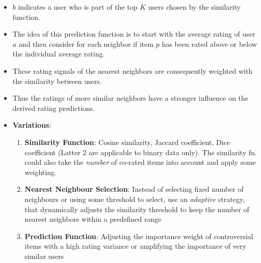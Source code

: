 \documentclass{article}
\begin{document}
\begin{itemize}
    \item $b$ indicates a user who is part of the top $K$ users chosen by the similarity function. 
    
    \item The idea of this prediction function is to start with the average rating of user $a$ and then consider for each neighbor if item $p$ has been rated above or below the individual average rating. 
    
    \item These rating signals of the nearest neighbors are consequently weighted with the similarity between users. 
    
    \item Thus the ratings of more similar neighbors have a stronger influence on the derived rating predictions. 
    
    \item \textbf{Variations}:
    \begin{enumerate}
        \item \textbf{Similarity Function}: Cosine similarity, Jaccard coefficient, Dice coefficient (Latter 2 are applicable to binary data only). The similarity fn. could also take the \textit{number} of co-rated items into account and apply some weighting. 
        
        \item \textbf{Nearest Neighbour Selection}: Instead of selecting fixed number of neighbours or using some threshold to select, use an \textit{adaptive} strategy, that dynamically adjusts the similarity threshold to keep the number of nearest neighbors within a predefined range
        
        \item \textbf{Prediction Function}: Adjusting the importance weight of controversial items with a high rating variance or amplifying the importance of very similar users 
    \end{enumerate}
\end{itemize}
\end{document}

